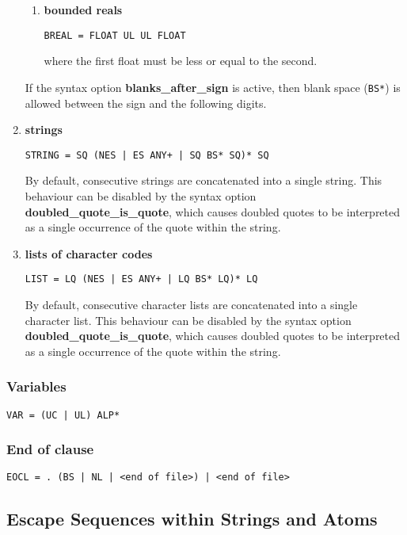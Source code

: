 \begin{enumerate}
\begin{enumerate}
\item{\bf bounded reals}
\begin{verbatim}
BREAL = FLOAT UL UL FLOAT
\end{verbatim}
where the first float must be less or equal to the second.

\end{enumerate}

If the syntax option {\bf blanks_after_sign} is active, then
blank space (\verb+BS*+) is allowed between the sign and the following digits.


\item{\bf strings}
\begin{verbatim}
STRING = SQ (NES | ES ANY+ | SQ BS* SQ)* SQ
\end{verbatim}
By default, consecutive strings are concatenated into a single string.
This behaviour can be disabled by the syntax option
{\bf doubled_quote_is_quote}, which causes doubled quotes to be
interpreted as a single occurrence of the quote within the string.

\item{\bf lists of character codes} 
\begin{verbatim}
LIST = LQ (NES | ES ANY+ | LQ BS* LQ)* LQ
\end{verbatim}
By default, consecutive character lists are concatenated into a single character list.
This behaviour can be disabled by the syntax option
{\bf doubled_quote_is_quote}, which causes doubled quotes to be
interpreted as a single occurrence of the quote within the string.
\end{enumerate}

\subsubsection{Variables}
\begin{verbatim}
VAR = (UC | UL) ALP*
\end{verbatim}

\subsubsection{End of clause}
\begin{verbatim}
EOCL = . (BS | NL | <end of file>) | <end of file>
\end{verbatim}


\subsection{Escape Sequences within Strings and Atoms}

